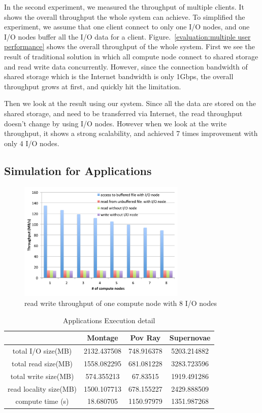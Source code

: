 In the second experiment, we measured the throughput of multiple clients.
It shows the overall throughput the whole system can achieve.
To simplified the experiment, we assume that one client connect to only one I/O nodes, and one I/O
nodes buffer all the I/O data for a client.
Figure.~\ref{evaluation:multiple user performance} shows the overall throughput of the whole system.
First we see the result of traditional solution in which all compute node connect to shared storage
and read write data concurrently.
However, since the connection bandwidth of shared storage which is the Internet bandwidth is only
1Gbps, the overall throughput grows at first, and quickly hit the limitation.

Then we look at the result using our system.
Since all the data are stored on the shared storage, and need to
be transferred via Internet, the read throughput doesn't change by using I/O nodes.
However when we look at the write throughput, it shows a strong scalability, and achieved 7 times
improvement with only 4 I/O nodes.

\subsection{Simulation for Applications}

\begin{figure}
\centering
\includegraphics[width=8cm]{img/simulation_throughput}
\caption{read write throughput of one compute node with 8 I/O nodes}
\label{evaluation:simulation throughput}
\end{figure}

\begin{table}
\centering
\begin{tabular}{|c|c|c|c|}
\hline
						&	Montage		&		Pov Ray		&		Supernovae		\\\hline
total I/O size(MB)		&	2132.437508	&		748.916378	&		5203.214882		\\\hline
total read size(MB)		&	1558.082295	&		681.081228	&		3283.723596		\\\hline
total write size(MB)	&	574.355213	&		67.83515	&		1919.491286		\\\hline
read locality size(MB)	&	1500.107713	&		678.155227	&		2429.888509		\\\hline
compute time (s)		&	18.680705	&		1150.97979	&		1351.987268		\\
\hline
\end{tabular}
\caption{Applications Execution detail}
\label{evaluation:application execution detail}
\end{table}

